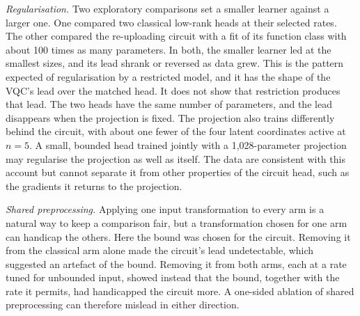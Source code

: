\documentclass{ieeeaccess}
\newcommand{\vqc}{VQC}
\begin{document}
\emph{Regularisation.} Two exploratory comparisons set a smaller learner against a larger one. One compared two classical low-rank heads at their selected rates. The other compared the re-uploading circuit with a fit of its function class with about 100 times as many parameters. In both, the smaller learner led at the smallest sizes, and its lead shrank or reversed as data grew. This is the pattern expected of regularisation by a restricted model, and it has the shape of the \vqc{}'s lead over the matched head. It does not show that restriction produces that lead. The two heads have the same number of parameters, and the lead disappears when the projection is fixed. The projection also trains differently behind the circuit, with about one fewer of the four latent coordinates active at $n=5$. A small, bounded head trained jointly with a 1,028-parameter projection may regularise the projection as well as itself. The data are consistent with this account but cannot separate it from other properties of the circuit head, such as the gradients it returns to the projection.

\emph{Shared preprocessing.} Applying one input transformation to every arm is a natural way to keep a comparison fair, but a transformation chosen for one arm can handicap the others. Here the bound was chosen for the circuit. Removing it from the classical arm alone made the circuit's lead undetectable, which suggested an artefact of the bound. Removing it from both arms, each at a rate tuned for unbounded input, showed instead that the bound, together with the rate it permits, had handicapped the circuit more. A one-sided ablation of shared preprocessing can therefore mislead in either direction.
\end{document}

